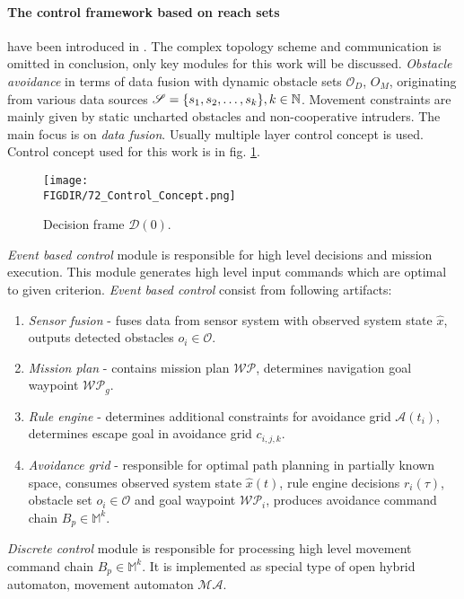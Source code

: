 \paragraph{The control framework based on reach sets} have been introduced in \cite{alojzgomola2017}. The complex topology scheme and communication is omitted in conclusion, only key modules for this work will be discussed. \emph{Obstacle avoidance} in terms of data fusion with dynamic obstacle sets $\mathscr{O}_D$, $O_M$, originating from various data sources $\mathscr{S}=\{s_1,s_2,\dots,s_k\}, k\in\mathbb{N}$. Movement constraints are mainly given by static uncharted obstacles and non-cooperative intruders. The main focus is on \emph{data fusion}. Usually multiple layer control concept is used. Control concept used for this work is in fig. \ref{fig:controlConceptIntro}.
\begin{figure}[H]
    \centering
    \texttt{[image: \\FIGDIR/72\_Control\_Concept.png]}
    \caption{Decision frame $\mathscr{D}(0)$.}
    \label{fig:controlConceptIntro}
\end{figure}

\noindent \emph{Event based control} module is responsible for high level decisions and mission execution. This module generates high level input commands which are optimal to given criterion. \emph{Event based control} consist from following artifacts:
\begin{enumerate}
    \item \emph{Sensor fusion} - fuses data from sensor system with observed system state $\hat{x}$, outputs detected obstacles $o_i\in\mathscr{O}$.
    \item \emph{Mission plan} - contains mission plan $\mathscr{WP}$, determines navigation goal waypoint $\mathscr{WP}_g$.
    \item \emph{Rule engine} - determines additional constraints for avoidance grid $\mathscr{A}(t_i)$, determines escape goal in avoidance grid $c_{i,j,k}$.
    \item \emph{Avoidance grid} - responsible for optimal path planning in partially known space, consumes observed system state $\hat{x}(t)$, rule engine decisions $r_i(\tau)$, obstacle set $o_i\in\mathscr{O}$ and goal waypoint $\mathscr{WP}_i$, produces avoidance command chain $B_p \in \mathbb{M}^k$.
\end{enumerate}

\emph{Discrete control} module is responsible for processing high level movement command chain $B_p \in \mathbb{M}^k$. It is implemented as special type of open hybrid automaton, movement automaton $\mathscr{MA}$. 

